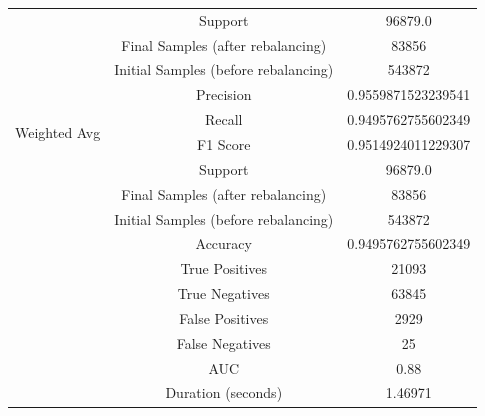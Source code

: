 \begin{longtable}{|c|c|c|}
 & Support & 96879.0 \\
 & Final Samples (after rebalancing) & 83856 \\
 & Initial Samples (before rebalancing) & 543872 \\
\hline
\multirow{4}{*}{Weighted Avg} & Precision & 0.9559871523239541 \\
 & Recall & 0.9495762755602349 \\
 & F1 Score & 0.9514924011229307 \\
 & Support & 96879.0 \\
 & Final Samples (after rebalancing) & 83856 \\
 & Initial Samples (before rebalancing) & 543872 \\
\hline
& Accuracy & 0.9495762755602349 \\ \hline
& True Positives & 21093 \\ \hline
& True Negatives & 63845 \\ \hline
& False Positives & 2929 \\ \hline
& False Negatives & 25 \\ \hline
& AUC & 0.88 \\ \hline
& Duration (seconds) & 1.46971 \\ \hline
\end{longtable}


